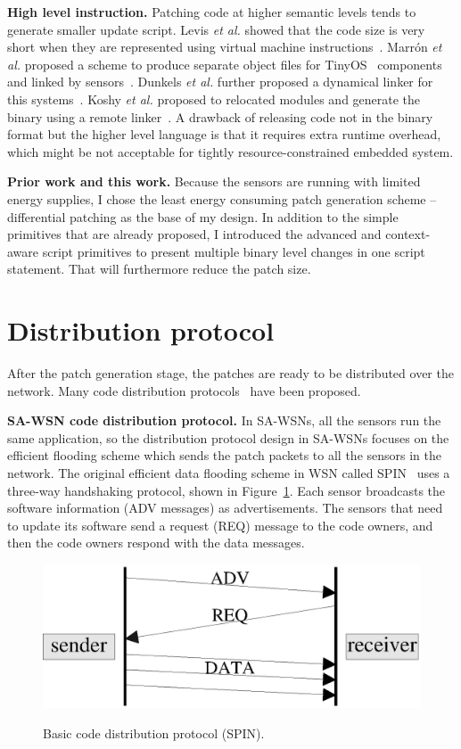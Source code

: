 \textbf{High level instruction.}
Patching code at higher semantic levels tends to generate smaller update script. Levis \textit{et al.} showed that the 
code size is very short when they are represented using virtual machine instructions~\cite{mate}. Marr\'on \textit{et 
al.} proposed a scheme to produce separate object files for TinyOS~\cite{tinyos} components and linked by 
sensors~\cite{related:flexcup}. Dunkels \textit{et al.} further proposed a dynamical linker for this 
systems~\cite{related:dynamic1}. Koshy \textit{et al.} proposed to relocated modules and generate the binary using a 
remote linker~\cite{related:dynamic2}.
A drawback of releasing code not in the binary format but the higher level language is that it requires extra runtime 
overhead, which might be not acceptable for tightly resource-constrained embedded system.

\textbf{Prior work and this work.}
Because the sensors are running with limited energy supplies, I chose the least energy consuming patch generation 
scheme -- differential patching as the base of my design.
In addition to the simple primitives that are already proposed, I introduced the advanced and context-aware script 
primitives to 
present multiple binary level changes in one script statement.
That will furthermore reduce the patch size.

\section{Distribution protocol}

After the patch generation stage, the patches are ready to be distributed over the network. Many code distribution 
protocols~\cite{spin,trickle,melete,deluge,mnp} have been proposed.

\textbf{SA-WSN code distribution protocol.}
In SA-WSNs, all the sensors run the same application, so the distribution protocol design in SA-WSNs focuses on the 
efficient flooding scheme which sends the patch packets to all the sensors in the network. The original efficient data 
flooding scheme in WSN called SPIN~\cite{spin} uses a three-way handshaking protocol, shown in Figure~\ref{fig:spin}. 
Each sensor broadcasts the software information (ADV messages) as advertisements. The sensors that need to update its 
software send a request (REQ) message to the code owners, and then the code owners respond with the data messages.

\begin{figure}[htbp]
	\centering
		\includegraphics[scale=0.45]{figures/basic-protocol.eps}
	\label{fig:spin}
	\caption{Basic code distribution protocol (SPIN).}
\end{figure}

